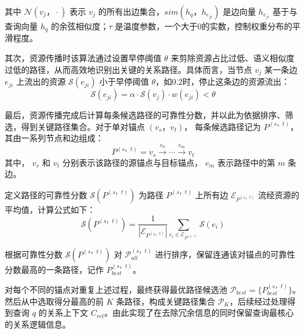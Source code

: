 \documentclass[promaster, vlined]{DissertUESTC}
\begin{document}
其中 $\mathcal{N}\left(v_j，\cdot\right)$ 表示 $v_j$ 的所有出边集合，$sim\left(h_q，h_{e_{ji}}\right)$ 是边向量 $h_{e_{ji}}$ 基于与查询向量 $h_q$ 的余弦相似度；$\tau$ 是温度参数，一个大于0的实数，控制权重分布的平滑程度。

其次，资源传播时该算法通过设置早停阈值 $\theta$ 来剪除资源占比过低、语义相似度过低的路径，从而高效地识别出关键的关系路径。具体而言，当节点 $v_j$ 某一条边 $e_{ji}$ 上流出的资源 $\mathcal{S}\left(e_{ji}\right)$ 小于早停阈值 $\theta$，如0.2时，停止这条边的资源流出：
\begin{equation}
\mathcal{S}\left(e_{ji}\right)=\alpha\cdot\mathcal{S}\left(v_j\right)\cdot w\left(e_{ji}\right)<\theta
\end{equation}

最后，资源传播完成后计算每条候选路径的可靠性分数，并以此为依据排序、筛选，得到关键路径集合。对于单对锚点 $(v_s， v_t)$， 每条候选路径记为 $P^{(s，t)}$， 其由一系列节点和边组成：
\begin{equation}
P^{(s，t)}=v_s \xrightarrow{e_0} \cdots \xrightarrow{e_m} v_t
\end{equation}
其中， $v_s$ 和 $v_t$ 分别表示该路径的源锚点与目标锚点， $e_m$ 表示路径中的第 $m$ 条边。

定义路径的可靠性分数 $\mathcal{S}\left(P^{(s，t)}\right)$ 为路径 $P^{(s，t)}$ 上所有边 $\mathcal{E}_{P^{(s，t)}}$ 流经资源的平均值，计算公式如下：
\begin{equation}
\mathcal{S}\left(P^{(s，t)}\right)=\frac{1}{\left|\mathcal{E}_{P^{(s，t)}}\right|}\sum_{e_i\in\mathcal{E}_{P^{(s，t)}}}\mathcal{S}\left(e_i\right)
\end{equation}

根据可靠性分数 $\mathcal{S}\left(P^{(s，t)}\right)$ 对 $\mathcal{P}_{all}^{(s，t)}$ 进行排序，保留连通该对锚点的可靠性分数最高的一条路径，记作 $P_{best}^{(s，t)}$。

对每个不同的锚点对重复上述过程，最终获得最优路径候选池 $\mathcal{P}_{best}=\{P_{best}^{(s，t)}\}$。然后从中选取得分最高的前 $K$ 条路径，构成关键路径集合 $\mathcal{P}_{K}$，后续经过处理得到查询 $q$ 的关系上下文 $C_{rel}$。由此实现了在去除冗余信息的同时保留查询最核心的关系逻辑信息。
\end{document}
